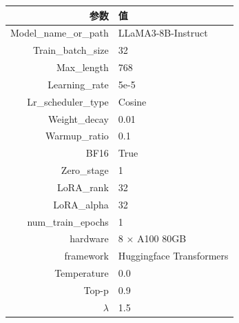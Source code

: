 \begin{table}[htbp]
\centering
{}
\footnotesize
\begin{tabular}{|r|l|}
\hline
\textbf{参数} & \textbf{值} \\
\hline
Model\_name\_or\_path & LLaMA3-8B-Instruct \\
Train\_batch\_size & 32 \\
Max\_length & 768 \\
Learning\_rate & 5e-5 \\
Lr\_scheduler\_type & Cosine \\
Weight\_decay & 0.01 \\
Warmup\_ratio & 0.1 \\
BF16 & True \\
Zero\_stage & 1 \\
LoRA\_rank & 32 \\
LoRA\_alpha & 32 \\
num\_train\_epochs & 1 \\
hardware & 8 × A100 80GB \\
framework & Huggingface Transformers \\
Temperature & 0.0 \\
Top-p & 0.9 \\
$\lambda$ & 1.5 \\ 
\hline
\end{tabular}

\label{tab:method3-training_config}
\end{table}

